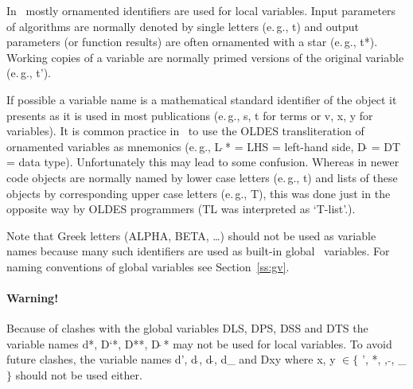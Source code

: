 In \redux\ mostly ornamented identifiers are used for local variables.
Input parameters of algorithms are normally denoted by single letters
(e.\,g., t) and output parameters (or function results) are often
ornamented with a star (e.\,g., t*).
Working copies of a variable are normally primed versions of the 
original variable (e.\,g., t').

If possible a variable name is a mathematical standard identifier of the
object it presents as it is used in most publications (e.\,g., s, t for terms
or v, x, y for variables).
It is common practice in \redux\ to use the OLDES transliteration of ornamented
variables as mnemonics (e.\,g., L$\,\hat{}\,$* = LHS = left-hand side,
D$\,\tilde{}$ = DT = data type).
Unfortunately this may lead to some confusion.
Whereas in newer code objects are normally named by lower case letters
(e.\,g., t) and lists of these objects by corresponding upper case letters
(e.\,g., T), this was done just in the opposite way by OLDES programmers
(TL was interpreted as `T-list'.).

Note that Greek letters (ALPHA, BETA, \ldots) should not be used as
variable names because many such identifiers are used as built-in
global \ALDES\ variables.
For naming conventions of global variables see Section~\ref{ss:gv}.

\paragraph{Warning!} 
Because of clashes with the global variables DLS, DPS, DSS and DTS
the variable names d*, D`*, D**, D$\,\tilde{}\,$* may not be used for local
variables.
To avoid future clashes, the variable names d', d\,$\hat{}$, d\,$\tilde{}$,
d\_ and Dxy where x, y $\in \{$ ', *, $\hat{}$, $\tilde{}$, \_ $\}$
should not be used either.

